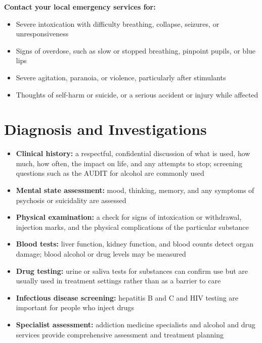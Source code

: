\textbf{Contact your local emergency services for:}
\begin{itemize}
    \item Severe intoxication with difficulty breathing, collapse, seizures, or unresponsiveness
    \item Signs of overdose, such as slow or stopped breathing, pinpoint pupils, or blue lips
    \item Severe agitation, paranoia, or violence, particularly after stimulants
    \item Thoughts of self-harm or suicide, or a serious accident or injury while affected
\end{itemize}

\section*{Diagnosis and Investigations}
\begin{itemize}
    \item \textbf{Clinical history:} a respectful, confidential discussion of what is used, how much, how often, the impact on life, and any attempts to stop; screening questions such as the AUDIT for alcohol are commonly used
    \item \textbf{Mental state assessment:} mood, thinking, memory, and any symptoms of psychosis or suicidality are assessed
    \item \textbf{Physical examination:} a check for signs of intoxication or withdrawal, injection marks, and the physical complications of the particular substance
    \item \textbf{Blood tests:} liver function, kidney function, and blood counts detect organ damage; blood alcohol or drug levels may be measured
    \item \textbf{Drug testing:} urine or saliva tests for substances can confirm use but are usually used in treatment settings rather than as a barrier to care
    \item \textbf{Infectious disease screening:} hepatitis B and C and HIV testing are important for people who inject drugs
    \item \textbf{Specialist assessment:} addiction medicine specialists and alcohol and drug services provide comprehensive assessment and treatment planning
\end{itemize}

